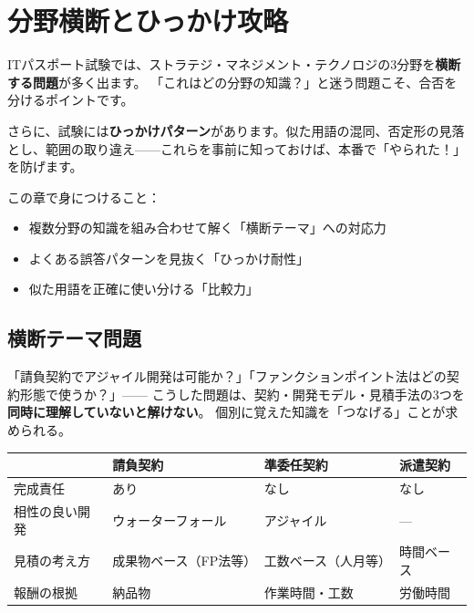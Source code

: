 \chapter{分野横断とひっかけ攻略}

ITパスポート試験では、ストラテジ・マネジメント・テクノロジの3分野を\textbf{横断する問題}が多く出ます。
「これはどの分野の知識？」と迷う問題こそ、合否を分けるポイントです。

さらに、試験には\textbf{ひっかけパターン}があります。似た用語の混同、否定形の見落とし、範囲の取り違え——これらを事前に知っておけば、本番で「やられた！」を防げます。

\begin{keypoint}
この章で身につけること：
\begin{itemize}
  \item 複数分野の知識を組み合わせて解く「横断テーマ」への対応力
  \item よくある誤答パターンを見抜く「ひっかけ耐性」
  \item 似た用語を正確に使い分ける「比較力」
\end{itemize}
\end{keypoint}

\section{横断テーマ問題}

\mondaipage
{}

\begin{stumble}
「請負契約でアジャイル開発は可能か？」「ファンクションポイント法はどの契約形態で使うか？」——
こうした問題は、契約・開発モデル・見積手法の3つを\textbf{同時に理解していないと解けない}。
個別に覚えた知識を「つなげる」ことが求められる。
\end{stumble}

\begin{comparison}
\begin{tabularx}{\textwidth}{lXXX}
  \toprule
  & \textbf{請負契約} & \textbf{準委任契約} & \textbf{派遣契約} \\
  \midrule
  完成責任 & あり & なし & なし \\
  相性の良い開発 & ウォーターフォール & アジャイル & --- \\
  見積の考え方 & 成果物ベース（FP法等） & 工数ベース（人月等） & 時間ベース \\
  報酬の根拠 & 納品物 & 作業時間・工数 & 労働時間 \\
  \bottomrule
\end{tabularx}
\end{comparison}

